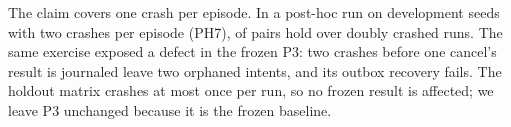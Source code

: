 The claim covers one crash per episode. In a post-hoc run on development seeds with two crashes per episode (PH7), \PHSevenPairsHold{} of \PHSevenPairs{} pairs hold over \PHSevenCrashedTwice{} doubly crashed runs. The same exercise exposed a defect in the frozen P3: two crashes before one cancel's result is journaled leave two orphaned intents, and its outbox recovery fails. The holdout matrix crashes at most once per run, so no frozen result is affected; we leave P3 unchanged because it is the frozen baseline.
